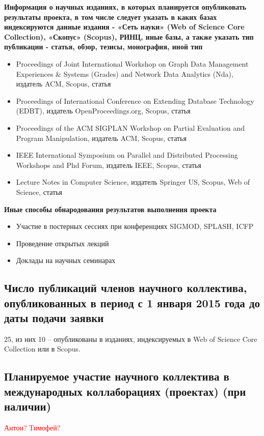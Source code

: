 \documentclass[12pt]{article}  %
\theoremstyle{remark}
\newcommand{\checkme}[1]{\textcolor{red}{#1}}
\begin{document}
\textbf{Информация о научных изданиях, в которых планируется опубликовать результаты проекта, в том числе следует указать в каких базах индексируются данные издания - «Сеть науки» (Web of Science Core Collection), «Скопус» (Scopus), РИНЦ, иные базы, а также указать тип публикации - статья, обзор, тезисы, монография, иной тип}
\begin{itemize}
  \item Proceedings of Joint International Workshop on Graph Data Management Experiences \& Systems (Grades) and Network Data Analytics (Nda), издатель  ACM, Scopus, статья
  \item Proceedings of International Conference on Extending Database Technology (EDBT), издатель OpenProceedings.org, Scopus, статья
  \item Proceedings of the ACM SIGPLAN Workshop on Partial Evaluation and Program Manipulation, издатель  ACM, Scopus, статья
  \item IEEE International Symposium on Parallel and Distributed Processing Workshops and Phd Forum, издатель  IEEE, Scopus, статья
  \item Lecture Notes in Computer Science, издатель Springer US, Scopus, Web of Science, статья
\end{itemize}

\textbf{Иные способы обнародования результатов выполнения проекта}
\begin{itemize}
\item Участие в постерных сессиях при конференциях SIGMOD, SPLASH, ICFP
\item Проведение открытых лекций
\item Доклады на научных семинарах
\end{itemize}

\subsection{Число публикаций членов научного коллектива, опубликованных в период с 1 января 2015 года до даты подачи заявки}

25, из них 10 – опубликованы в изданиях, индексируемых в Web of Science Core Collection или в Scopus.

\subsection{Планируемое участие научного коллектива в международных коллаборациях (проектах) (при наличии)}

\checkme{Антон? Тимофей?}
\end{document}
